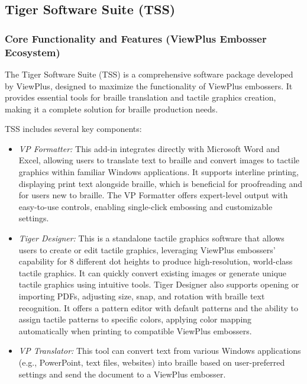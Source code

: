 \subsection{Tiger Software Suite (TSS)}

\subsubsection{Core Functionality and Features (ViewPlus Embosser Ecosystem)}

The Tiger Software Suite (TSS) is a comprehensive software package developed by ViewPlus, designed to maximize the functionality of ViewPlus embossers.\cite{EmeraldCoast,ElitaManual,DuxburyProducts,NimProQuick} It provides essential tools for braille translation and tactile graphics creation, making it a complete solution for braille production needs.\cite{EmeraldCoast,DuxburyProducts}

TSS includes several key components:
\begin{itemize}
    \item \emph{VP Formatter:} This add-in integrates directly with Microsoft Word and Excel, allowing users to translate text to braille and convert images to tactile graphics within familiar Windows applications.\cite{EmeraldCoast,ElitaManual,NimProQuick} It supports interline printing, displaying print text alongside braille, which is beneficial for proofreading and for users new to braille.\cite{EmeraldCoast} The VP Formatter offers expert-level output with easy-to-use controls, enabling single-click embossing and customizable settings.\cite{EmeraldCoast,NimProQuick}
    \item \emph{Tiger Designer:} This is a standalone tactile graphics software that allows users to create or edit tactile graphics, leveraging ViewPlus embossers' capability for 8 different dot heights to produce high-resolution, world-class tactile graphics.\cite{EmeraldCoast,ElitaManual,DuxburyProducts,NimProQuick} It can quickly convert existing images or generate unique tactile graphics using intuitive tools.\cite{EmeraldCoast,NimProQuick} Tiger Designer also supports opening or importing PDFs, adjusting size, snap, and rotation with braille text recognition.\cite{ElitaManual} It offers a pattern editor with default patterns and the ability to assign tactile patterns to specific colors, applying color mapping automatically when printing to compatible ViewPlus embossers.\cite{ElitaManual}
    \item \emph{VP Translator:} This tool can convert text from various Windows applications (e.g., PowerPoint, text files, websites) into braille based on user-preferred settings and send the document to a ViewPlus embosser.\cite{EmeraldCoast,NimProQuick}
\end{itemize}


